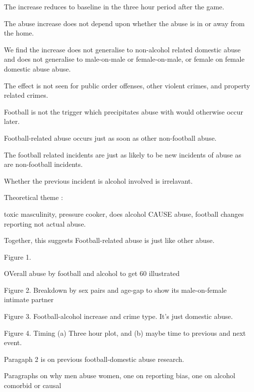 \documentclass[12pt, letterpaper]{article}
\begin{document}
The increase reduces to baseline in the three hour period after the game.

The abuse increase does not depend upon whether the abuse is in or away from the home.

We find the increase does not generalise to non-alcohol related domestic abuse and does not generalise to male-on-male or female-on-male, or female on female domestic abuse abuse. 

The effect is not seen for public order offenses, other violent crimes, and property related crimes.  

Football is not the trigger which precipitates abuse with would otherwise occur later. 

Football-related abuse occurs just as soon as other non-football abuse. 

The football related incidents are just as likely to be new incidents of abuse as are non-football incidents. 


Whether the previous incident is alcohol involved is irrelavant.

Theoretical theme :

toxic masculinity, pressure cooker, does alcohol CAUSE abuse, football changes reporting not actual abuse.

Together, this suggests Football-related abuse is just like other abuse. 


Figure 1.

OVerall abuse by football and alcohol to get 60 illustrated

Figure 2. Breakdown by sex pairs and age-gap to show its male-on-female intimate partner

Figure 3. Football-alcohol increase and crime type. It's just domestic abuse.

Figure 4. Timing (a) Three hour plot, and (b) maybe time to previous and next event.

Paragaph 2 is on previous football-domestic abuse research.

Paragraphs on why men abuse women, one on reporting bias, one on alcohol comorbid or causal
\end{document}
